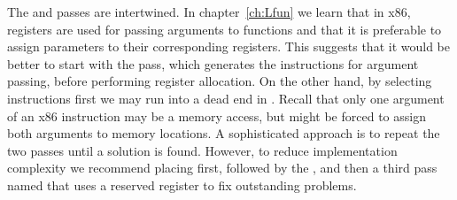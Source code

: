 \documentclass[7x10]{TimesAPriori_MIT}%
\numberwithin{theorem}{chapter}
\numberwithin{definition}{chapter}
\numberwithin{equation}{chapter}
\begin{document}
The  and  passes are
intertwined.
%
In chapter~\ref{ch:Lfun} we learn that in x86, registers are used for
passing arguments to functions and that it is preferable to assign
parameters to their corresponding registers.  This suggests that it
would be better to start with the  pass,
which generates the instructions for argument passing, before
performing register allocation.
%
On the other hand, by selecting instructions first we may run into a
dead end in . Recall that only one argument of an
x86 instruction may be a memory access, but  might
be forced to assign both arguments to memory locations.
%
A sophisticated approach is to repeat the two passes until a solution
is found. However, to reduce implementation complexity we recommend
placing  first, followed by the
, and then a third pass named 
that uses a reserved register to fix outstanding problems.
\end{document}
